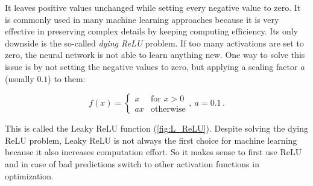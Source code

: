 It leaves positive values unchanged while setting every negative value to zero. It is commonly used in many machine learning approaches because it is very effective in preserving complex details by keeping computing efficiency. Its only downside is the so-called \textit{dying ReLU} problem. If too many activations are set to zero, the neural network is not able to learn anything new. One way to solve this issue is by not setting the negative values to zero, but applying a scaling factor $a$ (usually $0.1$) to them:

\begin{equation}
    f(x) = \begin{cases}
        x & \mbox{for } x > 0 \\ ax & \text{otherwise}
    \end{cases}, \: a = 0.1 \,.
\end{equation}

This is called the Leaky ReLU function (\autoref{fig:L_ReLU}). Despite solving the dying ReLU problem, Leaky ReLU is not always the first choice for machine learning because it also increases computation effort. So it makes sense to first use ReLU and in case of bad predictions switch to other activation functions in optimization.



